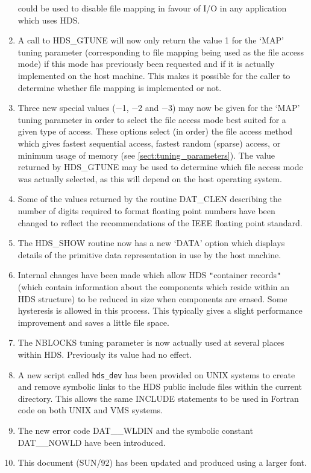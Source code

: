 \documentclass[11pt]{article}
\newcommand{\htmlref}[2]{#1}
\newcommand{\hi}[1]{{\tt{#1}}}
\newcommand{\qt}[1]{``#1''}
\renewcommand{\qt}[1]{{\tt{"}}#1{\tt{"}}}
\begin{document}
\begin{enumerate}
could be used to disable file mapping in favour of I/O in any
application which uses HDS.

\item
A call to \htmlref{HDS\_GTUNE}{HDS_GTUNE} will now only return the
value 1 for the `MAP' tuning parameter (corresponding to file mapping
being used as the file access mode) if this mode has previously been
requested and if it is actually implemented on the host machine. This
makes it possible for the caller to determine whether file mapping is
implemented or not.

\item
Three new special values ($-$1, $-$2 and $-$3) may now be given for
the `MAP' tuning parameter in order to select the file access mode
best suited for a given type of access. These options select (in
order) the file access method which gives fastest sequential access,
fastest random (sparse) access, or minimum usage of memory (see
\ref{sect:tuning_parameters}). The value returned by
\htmlref{HDS\_GTUNE}{HDS_GTUNE} may be used to determine which file
access mode was actually selected, as this will depend on the host
operating system.

\item
Some of the values returned by the routine
\htmlref{DAT\_CLEN}{DAT_CLEN} describing the number of digits required
to format floating point numbers have been changed to reflect the
recommendations of the IEEE floating point standard.

\item
The \htmlref{HDS\_SHOW}{HDS_SHOW} routine now has a new `DATA' option
which displays details of the primitive data representation in use by
the host machine.

\item
Internal changes have been made which allow HDS \qt{container records}
(which contain information about the components which reside within an
HDS structure) to be reduced in size when components are erased. Some
hysteresis is allowed in this process. This typically gives a slight
performance improvement and saves a little file space.

\item
The NBLOCKS tuning parameter is now actually used at several places
within HDS.  Previously its value had no effect.

\item
A new script called \hi{hds\_dev} has been provided on UNIX systems
to create and remove symbolic links to the HDS public include files
within the current directory. This allows the same INCLUDE statements
to be used in Fortran code on both UNIX and VMS systems.

\item
The new error code DAT\_\_WLDIN and the symbolic constant DAT\_\_NOWLD
have been introduced.

\item
This document (SUN/92) has been updated and produced using a larger
font.

\end{enumerate}
\end{document}
